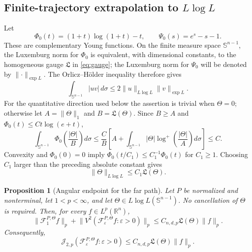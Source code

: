 \documentclass[11pt]{article}
\numberwithin{equation}{section}
\newtheorem{proposition}[theorem]{Proposition}
\theoremstyle{remark}
\theoremstyle{definition}
\newcommand{\R}{\mathbb R}
\newcommand{\Sph}{\mathbb S}
\newcommand{\cF}{\mathcal F}
\newcommand{\norm}[1]{\lVert #1\rVert}
\newcommand{\Jop}[1]{\mathcal J_{2,#1}}
\begin{document}
\subsection{Finite-trajectory extrapolation to
\texorpdfstring{$L\log L$}{L log L}}

Let
\[
 \Phi_0(t)=(1+t)\log(1+t)-t,
 \qquad \Psi_0(s)=e^s-s-1.
\]
These are complementary Young functions.  On the finite measure space
$\Sph^{n-1}$, the Luxemburg norm for $\Phi_0$ is equivalent, with
dimensional constants, to the
homogeneous gauge $\mathfrak L$ in \eqref{eq:gauge}; the Luxemburg norm
for $\Psi_0$ will be denoted by $\norm{\cdot}_{\exp L}$.  The
Orlicz--H\"older inequality therefore gives
\begin{equation}\label{eq:strong-far-Orlicz-Holder}
 \int_{\Sph^{n-1}}|uv|\,d\sigma
 \leq2\norm u_{L\log L}\norm v_{\exp L}.
\end{equation}
For the quantitative direction used below the assertion is trivial when
$\Theta=0$; otherwise let
$A=\norm\Theta_1$ and $B=\mathfrak L(\Theta)$.  Since $B\geq A$ and
$\Phi_0(t)\leq Ct\log(e+t)$,
\[
 \int_{\Sph^{n-1}}\Phi_0\!\left(\frac{|\Theta|}{B}\right)d\sigma
 \leq\frac C B\left[
 A+\int_{\Sph^{n-1}}|\Theta|
 \log^+\!\left(\frac{|\Theta|}{A}\right)d\sigma\right]\leq C.
\]
Convexity and $\Phi_0(0)=0$ imply
$\Phi_0(t/C_1)\leq C_1^{-1}\Phi_0(t)$ for $C_1\geq1$.
Choosing $C_1$ larger than the preceding absolute constant gives
\begin{equation}\label{eq:gauge-controls-Luxemburg}
 \norm\Theta_{L\log L}\leq C_1\mathfrak L(\Theta).
\end{equation}

\begin{proposition}[Angular endpoint for the far path]
\label{prop:strong-far-endpoint}
Let $P$ be normalized and nonterminal, let $1<p<\infty$, and let
$\Theta\in L\log L(\Sph^{n-1})$.  No cancellation of $\Theta$ is
required.  Then, for every $f\in L^p(\R^n)$,
\begin{equation}\label{eq:strong-far-endpoint}
 \norm{\cF^{P,\Theta}_1f}_p
 +\norm{V^2(\cF^{P,\Theta}_\varepsilon f:\varepsilon>0)}_p
 \leq C_{n,d,p}\mathfrak L(\Theta)\norm f_p.
\end{equation}
Consequently,
\begin{equation}\label{eq:strong-far-endpoint-jump}
 \Jop{p}(\cF^{P,\Theta}_\varepsilon f:\varepsilon>0)
 \leq C_{n,d,p}\mathfrak L(\Theta)\norm f_p.
\end{equation}
\end{proposition}
\end{document}
